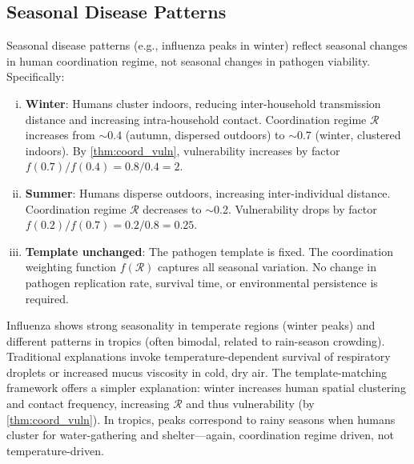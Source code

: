 \documentclass[11pt,twocolumn,a4paper]{article}
\newcommand{\Coord}{\mathcal{R}}
\begin{document}
\subsection{Seasonal Disease Patterns}

\begin{proposition}
\label{prop:seasonality}
Seasonal disease patterns (e.g., influenza peaks in winter) reflect seasonal changes in human coordination regime, not seasonal changes in pathogen viability. Specifically:

\begin{enumerate}[(i)]
\item \textbf{Winter}: Humans cluster indoors, reducing inter-household transmission distance and increasing intra-household contact. Coordination regime $\Coord$ increases from $\sim$0.4 (autumn, dispersed outdoors) to $\sim$0.7 (winter, clustered indoors). By \cref{thm:coord_vuln}, vulnerability increases by factor $f(0.7)/f(0.4) = 0.8/0.4 = 2$.

\item \textbf{Summer}: Humans disperse outdoors, increasing inter-individual distance. Coordination regime $\Coord$ decreases to $\sim$0.2. Vulnerability drops by factor $f(0.2)/f(0.7) = 0.2/0.8 = 0.25$.

\item \textbf{Template unchanged}: The pathogen template is fixed. The coordination weighting function $f(\Coord)$ captures all seasonal variation. No change in pathogen replication rate, survival time, or environmental persistence is required.
\end{enumerate}
\end{proposition}

\begin{example}
Influenza shows strong seasonality in temperate regions (winter peaks) and different patterns in tropics (often bimodal, related to rain-season crowding). Traditional explanations invoke temperature-dependent survival of respiratory droplets or increased mucus viscosity in cold, dry air. The template-matching framework offers a simpler explanation: winter increases human spatial clustering and contact frequency, increasing $\Coord$ and thus vulnerability (by \cref{thm:coord_vuln}). In tropics, peaks correspond to rainy seasons when humans cluster for water-gathering and shelter—again, coordination regime driven, not temperature-driven.
\end{example}
\end{document}
